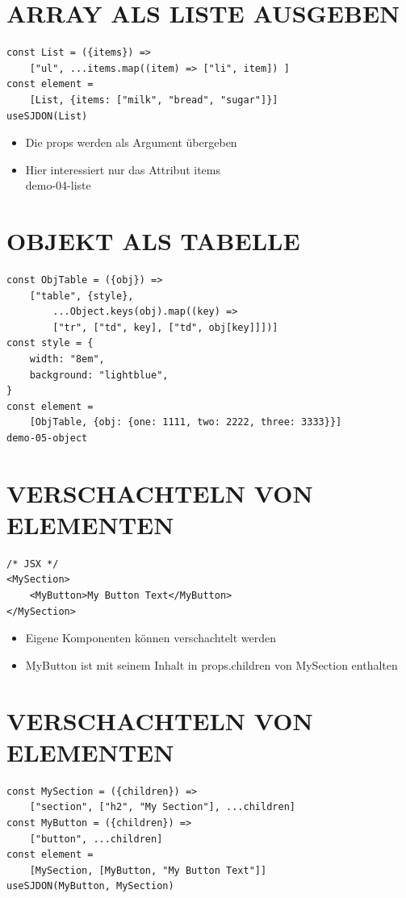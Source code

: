 \documentclass[10pt]{article}
\begin{document}
\section*{ARRAY ALS LISTE AUSGEBEN}
\begin{verbatim}
const List = ({items}) =>
    ["ul", ...items.map((item) => ["li", item]) ]
const element =
    [List, {items: ["milk", "bread", "sugar"]}]
useSJDON(List)
\end{verbatim}

\begin{itemize}
  \item Die props werden als Argument übergeben
  \item Hier interessiert nur das Attribut items\\
demo-04-liste
\end{itemize}

\section*{OBJEKT ALS TABELLE}
\begin{verbatim}
const ObjTable = ({obj}) =>
    ["table", {style},
        ...Object.keys(obj).map((key) =>
        ["tr", ["td", key], ["td", obj[key]]])]
const style = {
    width: "8em",
    background: "lightblue",
}
const element =
    [ObjTable, {obj: {one: 1111, two: 2222, three: 3333}}]
demo-05-object
\end{verbatim}

\section*{VERSCHACHTELN VON ELEMENTEN}
\begin{verbatim}
/* JSX */
<MySection>
    <MyButton>My Button Text</MyButton>
</MySection>
\end{verbatim}

\begin{itemize}
  \item Eigene Komponenten können verschachtelt werden
  \item MyButton ist mit seinem Inhalt in props.children von MySection enthalten
\end{itemize}

\section*{VERSCHACHTELN VON ELEMENTEN}
\begin{verbatim}
const MySection = ({children}) =>
    ["section", ["h2", "My Section"], ...children]
const MyButton = ({children}) =>
    ["button", ...children]
const element =
    [MySection, [MyButton, "My Button Text"]]
useSJDON(MyButton, MySection)
\end{verbatim}
\end{document}
